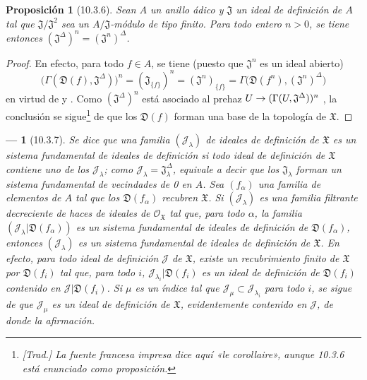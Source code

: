 \documentclass[oneside]{amsart}
\theoremstyle{ega-env-style}
\newtheorem*{env}{---}
\theoremstyle{ega-thm-env-style}
\newtheorem*{proposition}{Proposición}
\theoremstyle{ega-defn-env-style}
\renewcommand{\to}{\mathchoice{\longrightarrow}{\rightarrow}{\rightarrow}{\rightarrow}}
\newcommand{\oldpage}[2][]{{\marginnote{\normalfont{\textbf{#1}~|~#2}}}\ignorespaces}
\let\EGAOriginalLabel\label
\renewcommand{\label}[1]{\phantomsection\EGAOriginalLabel{#1}}
\begin{document}
\begin{proposition}[10.3.6]
\label{I.10.3.6}
Sean $A$ un anillo ádico y $\mathfrak{J}$ un ideal de definición de $A$ tal que $\mathfrak{J}/\mathfrak{J}^2$ sea un $A/\mathfrak{J}$-módulo de tipo finito. Para todo entero $n>0$, se tiene entonces $(\mathfrak{J}^\Delta)^n=(\mathfrak{J}^n)^\Delta$.
\end{proposition}

\begin{proof}
En efecto, para todo $f\in A$, se tiene (puesto que $\mathfrak{J}^n$ es un ideal abierto)
\[
  \bigl(\Gamma(\mathfrak{D}(f),\mathfrak{J}^\Delta)\bigr)^n
  =(\mathfrak{J}_{\{f\}})^n
  =(\mathfrak{J}^n)_{\{f\}}
  =\Gamma\bigl(\mathfrak{D}(f^n),(\mathfrak{J}^n)^\Delta\bigr)
\]
\oldpage[I]{185}
en virtud de  y .
Como $(\mathfrak{J}^\Delta)^n$ está asociado al prehaz $U\to(\Gamma(U,\mathfrak{J}^\Delta))^n$ , la conclusión se sigue\footnote{\emph{[Trad.] La fuente francesa impresa dice aquí «le corollaire», aunque 10.3.6 está enunciado como proposición.}} de que los $\mathfrak{D}(f)$ forman una base de la topología de $\mathfrak{X}$.
\end{proof}

\begin{env}[10.3.7]
\label{I.10.3.7}
Se dice que una familia $(\mathscr{J}_\lambda)$ de ideales de definición de $\mathfrak{X}$ es un \emph{sistema fundamental de ideales de definición} si todo ideal de definición de $\mathfrak{X}$ contiene uno de los $\mathscr{J}_\lambda$; como $\mathscr{J}_\lambda=\mathfrak{J}_\lambda^\Delta$, equivale a decir que los $\mathfrak{J}_\lambda$ forman un \emph{sistema fundamental de vecindades de} 0 en $A$.
Sea $(f_\alpha)$ una familia de elementos de $A$ tal que los $\mathfrak{D}(f_\alpha)$ recubren $\mathfrak{X}$.
Si $(\mathscr{J}_\lambda)$ es una familia filtrante decreciente de haces de ideales de $\mathscr{O}_{\mathfrak{X}}$ tal que, para todo $\alpha$, la familia $(\mathscr{J}_\lambda|\mathfrak{D}(f_\alpha))$ es un sistema fundamental de ideales de definición de $\mathfrak{D}(f_\alpha)$, entonces $(\mathscr{J}_\lambda)$ es un sistema fundamental de ideales de definición de $\mathfrak{X}$.
En efecto, para todo ideal de definición $\mathscr{J}$ de $\mathfrak{X}$, existe un recubrimiento finito de $\mathfrak{X}$ por $\mathfrak{D}(f_i)$ tal que, para todo $i$, $\mathscr{J}_{\lambda_i}|\mathfrak{D}(f_i)$ es un ideal de definición de $\mathfrak{D}(f_i)$ contenido en $\mathscr{J}|\mathfrak{D}(f_i)$.
Si $\mu$ es un índice tal que $\mathscr{J}_\mu\subset\mathscr{J}_{\lambda_i}$ para todo $i$, se sigue de  que $\mathscr{J}_\mu$ es un ideal de definición de $\mathfrak{X}$, evidentemente contenido en $\mathscr{J}$, de donde la afirmación.
\end{env}
\end{document}
